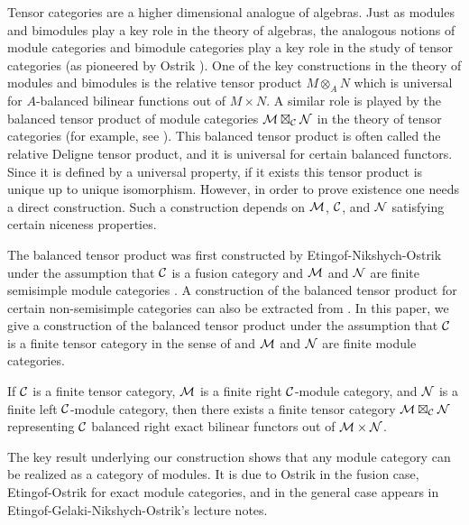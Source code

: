 \documentclass{amsart}
\begin{document}
\tikzexternaldisable




Tensor categories are a higher dimensional analogue of algebras.  Just as modules and bimodules play a key role in the theory of algebras, the analogous notions of module categories and bimodule categories play a key role in the study of tensor categories (as pioneered by Ostrik \cite{MR1976459}).  One of the key constructions in the theory of modules and bimodules is the relative tensor product $M \otimes_A N$ which is universal for $A$-balanced bilinear functions out of $M \times N$.   A similar role is played by the balanced tensor product of module categories $\mathcal M \boxtimes_\mathcal C \mathcal N$ in the theory of tensor categories (for example, see \cite{MR1966524, 0909.3140, MR2511638, MR2909758, 1202.4396, MR3022755, MR3063919}).  This balanced tensor product is often called the relative Deligne tensor product, and it is universal for certain balanced functors.  Since it is defined by a universal property, if it exists this tensor product is unique up to unique isomorphism.  However, in order to prove existence one needs a direct construction.  Such a construction depends on $\mathcal M$, $\mathcal C$, and $\mathcal N$ satisfying certain niceness properties.  

The balanced tensor product was first constructed by Etingof-Nikshych-Ostrik under the assumption that $\mathcal C$ is a fusion category and $\mathcal M$ and $\mathcal N$ are finite semisimple module categories \cite{0909.3140}.  A construction of the balanced tensor product for certain non-semisimple categories can also be extracted from \cite[Thm 3.1]{1102.3411}.   In this paper, we give a construction of the balanced tensor product under the assumption that $\mathcal C$ is a finite tensor category in the sense of \cite{EO-ftc} and $\mathcal M$ and $\mathcal N$ are finite module categories.  

\begin{maintheorem}
If $\mathcal C$ is a finite tensor category, $\mathcal M$ is a finite right $\mathcal C$-module category, and $\mathcal N$ is a finite left $\mathcal C$-module category, then there exists a finite tensor category $\mathcal M \boxtimes_\mathcal C \mathcal N$ representing $\mathcal C$ balanced right exact bilinear functors out of $\mathcal M \times \mathcal N$.
\end{maintheorem}

The key result underlying our construction shows that any module category can be realized as a category of modules.  It is due to Ostrik in the fusion case, Etingof-Ostrik for exact module categories, and in the general case appears in Etingof-Gelaki-Nikshych-Ostrik's lecture notes.
\end{document}
